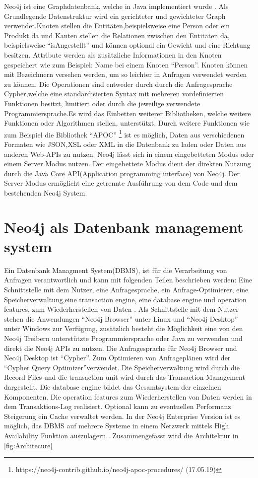 Neo4j ist eine Graphdatenbank, welche in Java implementiert wurde \parencite{vukotic2015neo4j}. Als Grundlegende Datenstruktur wird ein gerichteter und gewichteter  Graph verwendet.Knoten stellen die Entitäten,beispielsweise eine Person oder ein Produkt da und  Kanten stellen die Relationen zwischen den Entitäten da, beispielsweise “isAngestellt” und können optional ein Gewicht und eine Richtung besitzen. Attribute werden als zusätzliche Informationen in den Knoten gespeichert wie zum Beispiel: Name bei einem Knoten “Person”. Knoten können mit Bezeichnern versehen werden, um so leichter in Anfragen  verwendet werden zu können. Die Operationen sind entweder durch durch die  Anfragesprache  Cypher,welche eine standardisierten Syntax mit  mehreren vordefinierten Funktionen besitzt, limitiert oder durch die jeweilige verwendete Programmiersprache.Es wird das Einbetten weiterer Bibliotheken, welche weitere Funktionen oder Algorithmen stellen, unterstützt. Durch weitere Funktionen wie zum Beispiel die Bibliothek “APOC” \footnote{https://neo4j-contrib.github.io/neo4j-apoc-procedures/ (17.05.19) } ist es möglich, Daten aus verschiedenen Formaten wie JSON,XSL oder XML in die Datenbank zu laden oder Daten aus anderen Web-APIs zu nutzen. Neo4j lässt sich in einem  eingebetteten Modus oder einem  Server Modus nutzen. Der eingebettete Modus dient der direkten  Nutzung durch die Java Core API(Application programming interface)  von Neo4j. Der Server Modus ermöglicht eine getrennte Ausführung von dem Code und dem bestehenden Neo4j System.

\section{Neo4j als Datenbank management system}
Ein Datenbank Managment System(DBMS), ist für die Verarbeitung von Anfragen verantwortlich und kann mit folgenden Teilen beschrieben werden: Eine Schnittstelle mit dem Nutzer, eine Anfragesprache, ein Anfrage-Optimierer, eine Speicherverwaltung,eine transaction engine, eine database engine und operation features, zum Wiederherstellen von Daten \parencite{angles2012comparison}. Als Schnittstelle mit dem Nutzer stehen die Anwendungen “Neo4j Browser” unter Linux und “Neo4j Desktop” unter Windows zur Verfügung, zusätzlich besteht die Möglichkeit eine von den Neo4j Treibern unterstützte Programmiersprache  oder Java zu verwenden und direkt die Neo4j APIs zu nutzen. Die Anfragesprache für Neo4j Browser und Neo4j Desktop ist “Cypher”. Zum Optimieren von Anfrageplänen wird der “Cypher Query Optimizer”verwendet. Die Speicherverwaltung wird durch die Record Files und die transaction unit  wird durch das Transaction Management dargestellt. Die database engine bildet das Gesamtsystem der einzelnen Komponenten. Die operation features zum Wiederherstellen von Daten werden in dem Transaktions-Log realisiert. Optional kann zu eventuellen Performanz Steigerung ein Cache verwaltet werden. In der Neo4j Enterprise Version ist es möglich, das DBMS auf mehrere Systeme in einem Netzwerk mittels High Availability Funktion auszulagern \parencite{vukotic2015neo4j}. Zusammengefasst wird die Architektur in \ref{fig:Architecure}

